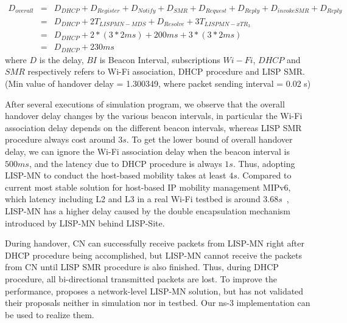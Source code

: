 \begin{eqnarray}
	D_{overall} &=& D_{DHCP} + D_{Register} + D_{Notify} + D_{SMR} + D_{Request} + D_{Reply} + D_{invokeSMR} + D_{Reply} \nonumber \\
	&=& D_{DHCP} + 2T_{LISPMN-MDS} + D_{Resolve} + 3T_{LISPMN-xTR_3} \nonumber \\
	&=& D_{DHCP} + 2* (3*2ms) + 200ms + 3*(3*2ms) \nonumber \\
	&=& D_{DHCP} + 230 ms
\end{eqnarray}
where $D$ is the delay, $BI$ is Beacon Interval, subscriptions $Wi-Fi$, $DHCP$ and $SMR$ respectively refers to Wi-Fi association, DHCP procedure and LISP SMR. (Min value of handover delay = 1.300349, where packet sending interval = 0.02 s) 

After several executions of simulation program, we observe that the overall handover delay changes by the various beacon intervals, in particular the Wi-Fi association delay depends on the different beacon intervals, whereas LISP SMR procedure always cost around $3s$. To get the lower bound of overall handover delay, we can ignore the Wi-Fi association delay when the beacon interval is $500ms$, and the latency due to DHCP procedure is always $1s$. Thus, adopting LISP-MN to conduct the host-based mobility takes at least $4s$. Compared to current most stable solution for host-based IP mobility management MIPv6, which latency including L2 and L3 in a real Wi-Fi testbed is around $3.68s$~\cite{vassiliou2010analysis}, LISP-MN has a higher delay caused by the double encapsulation mechanism introduced by LISP-MN behind LISP-Site. 

During handover, CN can successfully receive packets from LISP-MN right after DHCP procedure being accomplished, but LISP-MN cannot receive the packets from CN until LISP SMR procedure is also finished. Thus, during DHCP procedure, all bi-directional transmitted packets are lost. To improve the performance, \cite{tang2017lisp} proposes a network-level LISP-MN solution, but has not validated their proposals neither in simulation nor in testbed. Our ns-3 implementation can be used to realize them.



